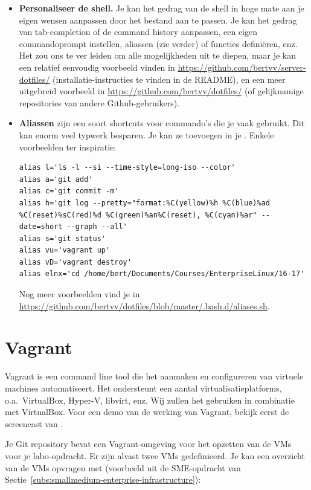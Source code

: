 \begin{itemize}
  \item \textbf{Personaliseer de shell.} Je kan het gedrag van de shell in hoge mate aan je eigen wensen aanpassen door het bestand  aan te passen. Je kan het gedrag van tab-completion of de command history aanpassen, een eigen commandoprompt instellen, aliassen (zie verder) of functies definiëren, enz. Het zou ons te ver leiden om alle mogelijkheden uit te diepen, maar je kan een relatief eenvoudig voorbeeld vinden in \url{https://github.com/bertvv/server-dotfiles/} (installatie-instructies te vinden in de README), en een meer uitgebreid voorbeeld in \url{https://github.com/bertvv/dotfiles/} (of gelijknamige repositories van andere Github-gebruikers).

  \item \textbf{Aliassen} zijn een soort shortcuts voor commando's die je vaak gebruikt. Dit kan enorm veel typwerk besparen. Je kan ze toevoegen in je . Enkele voorbeelden ter inspiratie:

    \begin{verbatim}
alias l='ls -l --si --time-style=long-iso --color'
alias a='git add'
alias c='git commit -m'
alias h='git log --pretty="format:%C(yellow)%h %C(blue)%ad %C(reset)%sC(red)%d %C(green)%an%C(reset), %C(cyan)%ar" --date=short --graph --all'
alias s='git status'
alias vu='vagrant up'
alias vD='vagrant destroy'
alias elnx='cd /home/bert/Documents/Courses/EnterpriseLinux/16-17'
\end{verbatim}

    Nog meer voorbeelden vind je in \url{https://github.com/bertvv/dotfiles/blob/master/.bash.d/aliases.sh}.
\end{itemize}

\section{Vagrant}
\label{sec:vagrant}

Vagrant is een command line tool die het aanmaken en configureren van virtuele machines automatiseert. Het ondersteunt een aantal virtualisatieplatforms, o.a.~VirtualBox, Hyper-V, libvirt, enz. Wij zullen het gebruiken in combinatie met VirtualBox. Voor een demo van de werking van Vagrant, bekijk eerst de screencast van \textcite{Weissig2014}.

Je Git repository bevat een Vagrant-omgeving voor het opzetten van de VMs voor je labo-opdracht. Er zijn alvast twee VMs gedefinieerd.  Je kan een overzicht van de VMs opvragen met (voorbeeld uit de SME-opdracht van Sectie~\ref{subs:smallmedium-enterprise-infrastructure}):

